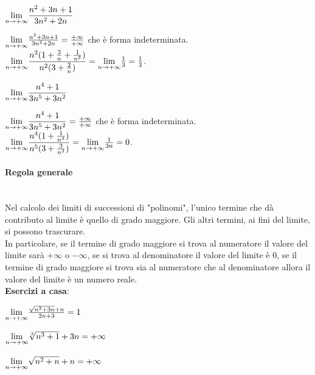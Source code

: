 \documentclass[12pt]{report}
\newcounter{exercise}
\begin{document}
	\begin{assignment}{}{}
		$\mathlarger{\lim_{n \to +\infty}}\dfrac{n^2 + 3n + 1}{3n^2+2n}$
		\begin{exercise}{}{}
			$\mathlarger{\lim_{n \to +\infty}}\frac{n^2+3n+1}{3n^2+2n}=\frac{+\infty}{+\infty}$ che è forma indeterminata. \\
			$\mathlarger{\lim_{n \to +\infty}}\dfrac{n^2(1 + \frac{3}{n} + \frac{1}{n^2})}{n^2(3 + \frac{2}{n})} = \mathlarger{\lim_{n \to +\infty}}\frac{1}{3}=\frac{1}{3}$.
		\end{exercise}
	\end{assignment}

	\begin{assignment}{}{}
		$\mathlarger{\lim_{n \to +\infty}}\dfrac{n^4 + 1}{3n^5+3n^2}$
		\begin{exercise}{}{}
			$\mathlarger{\lim_{n \to +\infty}}\dfrac{n^4+1}{3n^5+3n^2}=\frac{+\infty}{+\infty}$ che è forma indeterminata. \\
			$\mathlarger{\lim_{n \to +\infty}}\dfrac{n^4(1 + \frac{1}{n^4})}{n^5(3 + \frac{3}{n^3})} = \mathlarger{\lim_{n \to +\infty}}\frac{1}{3n}=0$.
		\end{exercise}
	\end{assignment}
	\paragraph{Regola generale} \quad \\
	Nel calcolo dei limiti di successioni di "polinomi", l'unico termine che dà contributo al limite è quello di grado maggiore. Gli altri termini, ai fini del limite, si possono trascurare. \\
	In particolare, se il termine di grado maggiore si trova al numeratore il valore del limite sarà $+\infty$ o $-\infty$, se si trova al denominatore il valore del limite è 0, se il termine di grado maggiore si trova sia al numeratore che al denominatore allora il valore del limite è un numero reale. \\
	\textbf{Esercizi a casa}:
	\begin{assignment}{}{}
		$\mathlarger{\lim_{n \to +\infty}}\frac{\sqrt{n^2+3n} + n}{2n + 3} = 1$
	\end{assignment}

	\begin{assignment}{}{}
		$\mathlarger{\lim_{n \to +\infty}}\sqrt[3]{n^3+1} + 3n = +\infty$
	\end{assignment}

	\begin{assignment}{}{}
		$\mathlarger{\lim_{n \to +\infty}}\sqrt{n^2+n} + n = +\infty$
	\end{assignment}
\end{document}
